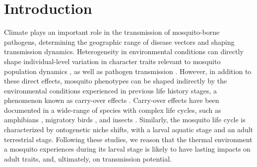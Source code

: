 \documentclass{bmcart}
\begin{document}


\section*{Introduction}

Climate plays an important role in the transmission of mosquito-borne pathogens, determining the geographic range of disease vectors and shaping transmission dynamics.
Heterogeneity in environmental conditions can directly shape individual-level variation in character traits relevant to mosquito population dynamics \citep{delatte2009}, as well as pathogen transmission \citep{murdock2012}.
However, in addition to these direct effects, mosquito phenotypes can be shaped indirectly by the environmental conditions experienced in previous life history stages, a phenomenon known as carry-over effects \citep{harrison2011}.
Carry-over effects have been documented in a wide-range of species with complex life cycles, such as amphibians \citep{vonesh2005}, migratory birds \citep{norris2006}, and insects \citep{deblock2005a}.
Similarly, the mosquito life cycle is characterized by ontogenetic niche shifts, with a larval aquatic stage and an adult terrestrial stage.
Following these studies, we reason that the thermal environment a mosquito experiences during its larval stage is likely to have lasting impacts on adult traits, and, ultimately, on transmission potential.
\end{document}
